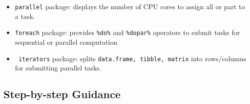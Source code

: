 \documentclass[
]{article}
\begin{document}
\begin{itemize}
\item
  \texttt{parallel} package: displays the number of CPU cores to assign
  all or part to a task.
\item
  \texttt{foreach} package: provides \texttt{\%do\%} and
  \texttt{\%dopar\%} operators to submit tasks for sequential or
  parallel computation
\item
  \texttt{\textasciigrave{}\ iterators} package: splits
  \texttt{data.frame,\ tibble,\ matrix} into rows/columns for submitting
  parallel tasks.
\end{itemize}

\hypertarget{step-by-step-guidance}{%
\subsection{Step-by-step Guidance}\label{step-by-step-guidance}}
\end{document}

